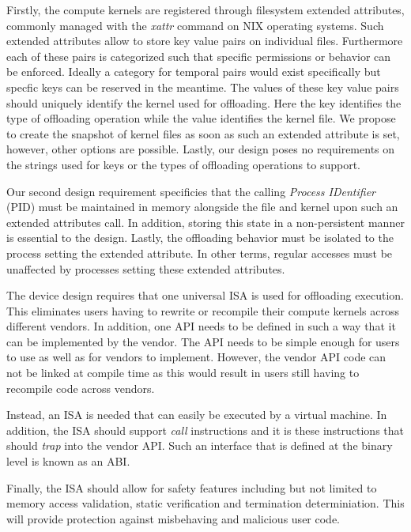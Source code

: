 Firstly, the compute kernels are registered through filesystem extended
attributes, commonly managed with the \textit{xattr} command on NIX operating
systems\footnotemark[10]. Such extended attributes allow to store key value
pairs on individual files. Furthermore each of these pairs is categorized such
that specific permissions or behavior can be enforced. Ideally a category for
temporal pairs would exist specifically but specfic keys can be reserved in the
meantime. The values of these key value pairs should uniquely identify the
kernel used for offloading. Here the key identifies the type of offloading
operation while the value identifies the kernel file. We propose to create the
snapshot of kernel files as soon as such an extended attribute is set, however,
other options are possible. Lastly, our design poses no requirements on the
strings used for keys or the types of offloading operations to support.


Our second design requirement specificies that the calling
\textit{Process IDentifier} (PID) must be maintained in memory alongside the
file and kernel upon such an extended attributes call. In addition, storing this
state in a non-persistent manner is essential to the design. Lastly, the
offloading behavior must be isolated to the process setting the extended
attribute. In other terms, regular accesses must be unaffected by processes
setting these extended attributes.

The device design requires that one universal ISA is used for offloading
execution. This eliminates users having to rewrite or recompile their compute
kernels across different vendors. In addition, one API needs to be defined in
such a way that it can be implemented by the vendor. The API needs to be
simple enough for users to use as well as for vendors to implement. However, the
vendor API code can not be linked at compile time as this would result in users
still having to recompile code across vendors.

Instead, an ISA is needed that can easily be executed by a virtual machine. In
addition, the ISA should support \textit{call} instructions and it is these
instructions that should \textit{trap} into the vendor API. Such an interface
that is defined at the binary level is known as an ABI.

Finally, the ISA should allow for safety features including but not limited to 
memory access validation, static verification and termination determiniation.
This will provide protection against misbehaving and malicious user code.

